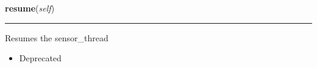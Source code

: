     \vspace{0.5ex}

\hspace{.8\funcindent}\begin{boxedminipage}{\funcwidth}

    \raggedright \textbf{resume}(\textit{self})

    \vspace{-1.5ex}

    \rule{\textwidth}{0.5\fboxrule}
\setlength{\parskip}{2ex}
    Resumes the sensor\_thread

    \begin{itemize}
    \setlength{\parskip}{0.6ex}
      \item Deprecated

    \end{itemize}

\setlength{\parskip}{1ex}
    \end{boxedminipage}

